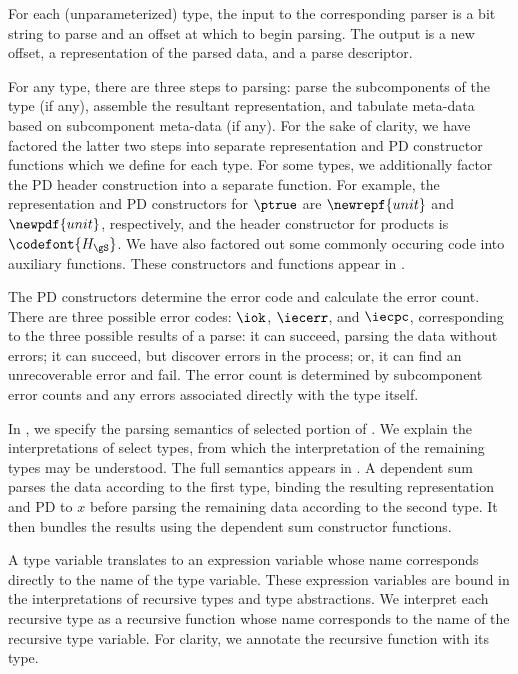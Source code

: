 {For each (unparameterized) type, the input to the corresponding parser
is a bit string to parse and an offset at which to begin parsing.  
The output is a new offset,
a representation of the parsed data, and a parse descriptor.

For any type, there are three steps to parsing: parse the
subcomponents of the type (if any), assemble the resultant
representation, and tabulate meta-data based on subcomponent meta-data
(if any). For the sake of clarity, we have factored the latter two
steps into separate representation and PD constructor functions which
we define for each type. For some types, we additionally factor the PD
header construction into a separate function. For example, the
representation and PD constructors for $\ptrue$ are $\newrepf {unit}$
and $\newpdf {unit}$, respectively, and the header constructor for
products is ${\codefont{H_{\gS}}}$.  We have also factored out some commonly
occuring code into auxiliary functions.  These constructors and functions
appear in .

The PD constructors determine the error code and calculate the error
count.  There are three possible error codes: $\iok$, $\iecerr$, and
$\iecpc$, corresponding to the three possible results of a parse: it
can succeed, parsing the data without errors; it can succeed, but
discover errors in the process; or, it can find an unrecoverable error
and fail.  The error count is determined by subcomponent error counts
and any errors associated directly with the type itself.

In , we specify the parsing semantics of
selected portion of \ddc{}. We explain the interpretations of select
types, from which the interpretation of the remaining types may be
understood. The full semantics appears in .
A dependent sum parses the data according to the first type, binding
the resulting representation and PD to $x$ before parsing the
remaining data according to the second type. It then bundles the
results using the dependent sum constructor functions.

A type variable translates to an expression variable whose name
corresponds directly to the name of the type variable. These
expression variables are bound in the interpretations of recursive
types and type abstractions. We interpret each recursive type as a
recursive function whose name corresponds to the name of the recursive
type variable. For clarity, we annotate the recursive function with its
type.

}
